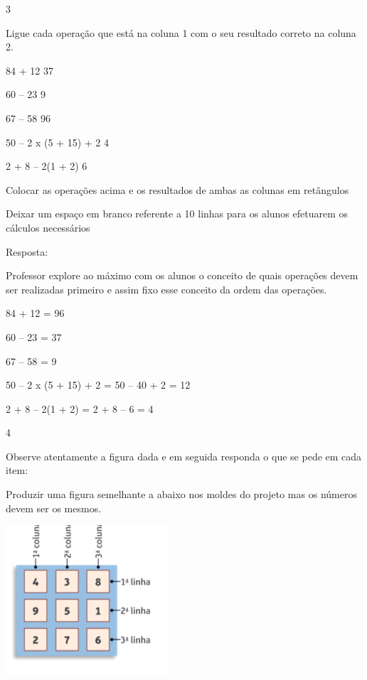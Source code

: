 \num{3}

Ligue cada operação que está na coluna 1 com o seu resultado correto na
coluna 2.

84 + 12 37

60 -- 23 9

67 -- 58 96

50 -- 2 x (5 + 15) + 2 4

2 + 8 -- 2(1 + 2) 6

Colocar as operações acima e os resultados de ambas as colunas em
retângulos

Deixar um espaço em branco referente a 10 linhas para os alunos
efetuarem os cálculos necessários

Resposta:

Professor explore ao máximo com os alunos o conceito de quais operações
devem ser realizadas primeiro e assim fixo esse conceito da ordem das
operações.

84 + 12 = 96

60 -- 23 = 37

67 -- 58 = 9

50 -- 2 x (5 + 15) + 2 = 50 -- 40 + 2 = 12

2 + 8 -- 2(1 + 2) = 2 + 8 -- 6 = 4

\num{4}

Observe atentamente a figura dada e em seguida responda o que se pede em
cada item:

Produzir uma figura semelhante a abaixo nos moldes do projeto mas os
números devem ser os mesmos.

\includegraphics[width=2.37521in,height=2.18352in]{media/image21.png}

